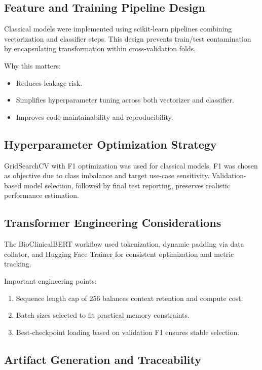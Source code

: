 \documentclass[11pt]{article}
\begin{document}
\subsection{Feature and Training Pipeline Design}

Classical models were implemented using scikit-learn pipelines combining vectorization and classifier steps. This design prevents train/test contamination by encapsulating transformation within cross-validation folds.


Why this matters:


\begin{itemize}
  \item Reduces leakage risk.
  \item Simplifies hyperparameter tuning across both vectorizer and classifier.
  \item Improves code maintainability and reproducibility.
\end{itemize}

\subsection{Hyperparameter Optimization Strategy}

GridSearchCV with F1 optimization was used for classical models. F1 was chosen as objective due to class imbalance and target use-case sensitivity. Validation-based model selection, followed by final test reporting, preserves realistic performance estimation.


\subsection{Transformer Engineering Considerations}

The BioClinicalBERT workflow used tokenization, dynamic padding via data collator, and Hugging Face Trainer for consistent optimization and metric tracking.


Important engineering points:


\begin{enumerate}
  \item Sequence length cap of 256 balances context retention and compute cost.
  \item Batch sizes selected to fit practical memory constraints.
  \item Best-checkpoint loading based on validation F1 ensures stable selection.
\end{enumerate}

\subsection{Artifact Generation and Traceability}
\end{document}
